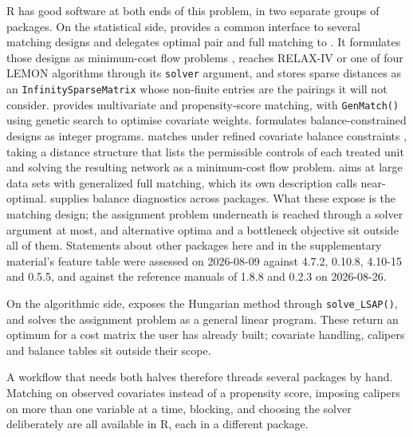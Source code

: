 R has good software at both ends of this problem, in two separate groups of
packages. On the statistical side,  \citep{MatchIt} provides a
common interface to several matching designs and delegates optimal pair and
full matching to  \citep{optmatch}. It formulates those designs as minimum-cost flow problems \citep{HansenKlopfer2006}, reaches RELAX-IV
or one of four LEMON algorithms through its \texttt{solver} argument, and stores
sparse distances as an \texttt{InfinitySparseMatrix} whose non-finite entries are the
pairings it will not consider.  \citep{Matching} provides
multivariate and propensity-score matching, with \texttt{GenMatch()} using genetic
search to optimise covariate weights.  \citep{designmatch}
formulates balance-constrained designs as integer programs.
 \citep{rcbalance} matches under refined covariate balance
constraints \citep{Pimentel2015}, taking a distance structure that lists the
permissible controls of each treated unit and solving the resulting network as
a minimum-cost flow problem.  \citep{quickmatch} aims at large
data sets with generalized full matching, which its own description calls
near-optimal.  \citep{cobalt} supplies balance diagnostics across
packages. What these expose is the matching design; the assignment problem
underneath is reached through a solver argument at most, and alternative optima
and a bottleneck objective sit outside all of them. Statements about other
packages here and in the supplementary material's feature table were assessed on 2026-08-09
against  4.7.2,  0.10.8,  4.10-15 and
 0.5.5, and against the reference manuals of
 1.8.8 and  0.2.3 on 2026-08-26.

On the algorithmic side,  \citep{clue} exposes the Hungarian method
through \texttt{solve\_LSAP()}, and  \citep{lpSolve} solves the assignment
problem as a general linear program. These return an optimum for a cost matrix
the user has already built; covariate handling, calipers and balance tables sit
outside their scope.

A workflow that needs both halves therefore threads several packages by hand.
Matching on observed covariates instead of a propensity score, imposing
calipers on more than one variable at a time, blocking, and choosing the solver
deliberately are all available in R, each in a different package.

